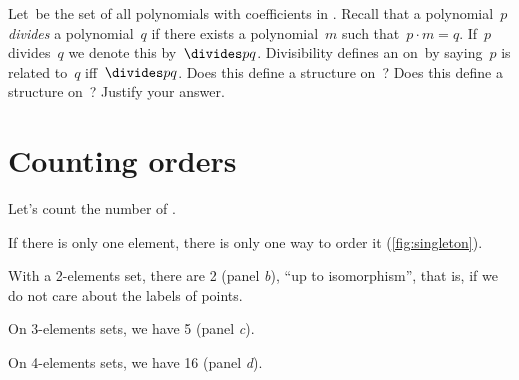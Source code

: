 \vfill
\begin{gradedexercise}
    \label{ex:PolynomialDivisibility}
    Let~\setA be the set of all polynomials with coefficients in \reals.
    Recall that a polynomial~$p$ \emph{divides} a polynomial~$q$ if there exists a polynomial~$m$ such that~$p \cdot m = q$.
    If~$p$ divides~$q$ we denote this by~$\divides p q$.
    Divisibility defines an  on~\setA by saying~$p$ is related to~$q$ iff~$\divides p q$.
    Does this define a  structure on~\setA?
    Does this define a  structure on~\setA?
    Justify your answer.
\end{gradedexercise}

\section{Counting orders}


Let's count the number of .

If there is only one element, there is only one way to order it (\cref{fig:singleton}).

With a 2-elements set, there are 2  (panel \emph{b}), ``up to isomorphism'',
that is, if we do not care about the labels of points.

On 3-elements sets, we have 5  (panel \emph{c}).

On 4-elements sets, we have 16  (panel \emph{d}).

\vfill


